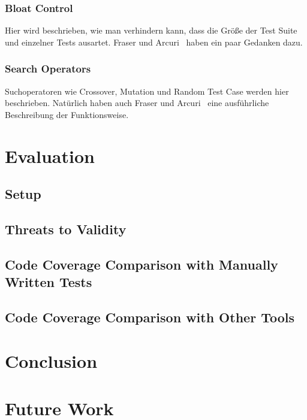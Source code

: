 \documentclass{article}
\begin{document}
\subsubsection{Bloat Control}
Hier wird beschrieben, wie man verhindern kann, dass die Größe der Test Suite und einzelner Tests ausartet. Fraser und Arcuri~\cite{Fraser_2011} haben ein paar Gedanken dazu. 

\subsubsection{Search Operators}
Suchoperatoren wie Crossover, Mutation und Random Test Case werden hier beschrieben. Natürlich haben auch Fraser und Arcuri~\cite{Fraser_2011} eine ausführliche Beschreibung der Funktionsweise. 

\section{Evaluation}
\subsection{Setup}
\subsection{Threats to Validity}
\subsection{Code Coverage Comparison with Manually Written Tests}
\subsection{Code Coverage Comparison with Other Tools}


\section{Conclusion}

\section{Future Work}

\appendix





\end{document}
